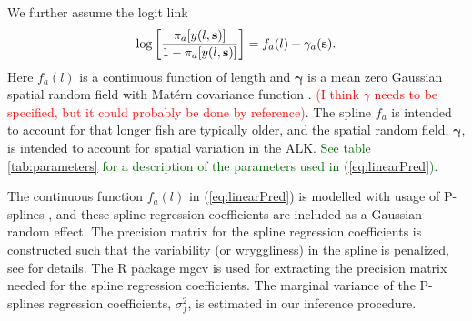\documentclass[a4paper 12pt]{article}
\numberwithin{equation}{section}
\newcommand{\ed}[1]{\textcolor{red}{#1}}
\newcommand{\olav}[1]{\textcolor{darkgreen}{#1}}
\begin{document}
We further assume the logit link
\begin{equation}\label{eq:linearPred}
\log \left[ \frac{\pi_a[y(l,{\bf s})]}{1-\pi_a[y(l,{\bf s})]}\right] = f_a(l) + \gamma_a({\bf s}).
\end{equation}
Here $ f_a(l)$ is a continuous function of length and $\pmb{\gamma}$ is a mean zero Gaussian spatial random field with Mat\'{e}rn covariance function \olav{\citep{stein2012interpolation}}. \ed{(I think $\gamma$ needs to be specified, but it could probably be done by reference)}. The spline $f_a$ is intended to account for that longer fish are typically older, and the spatial random field, $\pmb{\gamma}$, is intended to account for spatial variation in the ALK. \olav{See table \ref{tab:parameters} for a description of the parameters used in (\ref{eq:linearPred}). }

The continuous function $f_a(l)$ in (\ref{eq:linearPred}) is modelled with usage of P-splines \citep{wood2017generalized}, and these spline regression coefficients are included as a Gaussian random effect. The precision matrix for the spline regression coefficients is constructed such that the variability (or wryggliness) in the spline is penalized, see \citet[page 239]{wood2017generalized} for details. The R package mgcv \citep{wood2015package} is used for extracting the precision matrix needed for the spline regression coefficients. The marginal variance of the P-splines regression coefficients, $\sigma_f^2$, is estimated in our inference procedure. 
\end{document}
